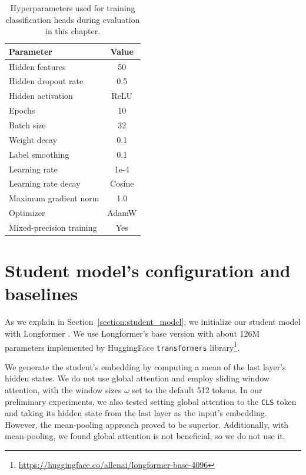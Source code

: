 \begin{table}
  \centering
  \footnotesize

  \begin{tabular}{l c}
    \toprule
    Parameter & Value \\
    \midrule
    Hidden features & 50 \\
    Hidden dropout rate & 0.5 \\
    Hidden activation & ReLU \\
    Epochs & 10 \\
    Batch size & 32 \\
    Weight decay & 0.1 \\
    Label smoothing & 0.1 \\
    Learning rate & 1e-4 \\
    Learning rate decay & Cosine \\
    Maximum gradient norm & 1.0 \\
    Optimizer & AdamW \\
    Mixed-precision training & Yes \\
    \bottomrule
  \end{tabular}

  \caption{Hyperparameters used for training classification heads during
  evaluation in this chapter.}

  \label{table:head_train_params}

\end{table}

\section{Student model's configuration and baselines}\label{section:student_model_config_baselines}

As we explain in Section~\ref{section:student_model}, we initialize our
student model with Longformer \citep{beltagy2020longformer}. We use
Longformer's base version with about 126M parameters implemented by HuggingFace
\texttt{transformers}
library\footnote{\url{https://huggingface.co/allenai/longformer-base-4096}}.

We generate the student's embedding by computing a mean of the last layer's
hidden states. We do not use global attention and employ sliding window
attention, with the window sizes $\omega$ set to the default 512 tokens. In our
preliminary experiments, we also tested setting global attention to the
\texttt{CLS} token and taking its hidden state from the last layer as the
input's embedding. However, the mean-pooling approach proved to be superior.
Additionally, with mean-pooling, we found global attention is not beneficial,
so we do not use it.

